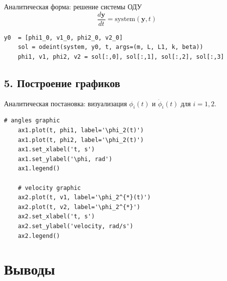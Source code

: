 \documentclass[a4paper,11pt]{article}
\theoremstyle{definition}
\begin{document}
Аналитическая форма: решение системы ОДУ
\begin{equation}
  \frac{d\mathbf{y}}{dt} = \mathrm{system}(\mathbf{y}, t)\label{eq:equation3}
\end{equation}

\begin{lstlisting}[language=MyPython,label={lst:lstlisting4}]
    y0  = [phi1_0, v1_0, phi2_0, v2_0]
    sol = odeint(system, y0, t, args=(m, L, L1, k, beta))
    phi1, v1, phi2, v2 = sol[:,0], sol[:,1], sol[:,2], sol[:,3]
\end{lstlisting}

\subsection*{5. Построение графиков}

Аналитическая постановка: визуализация $\phi_i(t)$ и $\dot{\phi}_i(t)$ для $i=1,2$.

\begin{lstlisting}[language=MyPython,label={lst:lstlisting5}]
    # angles graphic
    ax1.plot(t, phi1, label='\phi_2(t)')
    ax1.plot(t, phi2, label='\phi_2(t)')
    ax1.set_xlabel('t, s')
    ax1.set_ylabel('\phi, rad')
    ax1.legend()

    # velocity graphic
    ax2.plot(t, v1, label='\phi_2^{*}(t)')
    ax2.plot(t, v2, label='\phi_2^{*}')
    ax2.set_xlabel('t, s')
    ax2.set_ylabel('velocity, rad/s')
    ax2.legend()
\end{lstlisting}

%
%


\section*{Выводы}
\end{document}
